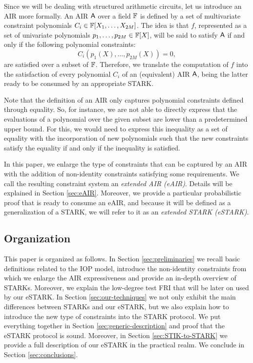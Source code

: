 Since we will be dealing with structured arithmetic circuits, let us introduce an AIR more formally. An AIR $\textsf{A}$ over a field $\mathbb{F}$ is defined by a set of multivariate constraint polynomials $C_i \in \mathbb{F}[X_1,\dots, X_{2M}]$. The idea is that $f$, represented as a set of univariate polynomials $p_1,\dots,p_{2M} \in \mathbb{F}[X]$, will be said to satisfy $\textsf{A}$ if and only if the following polynomial constraints:
\[
C_i(p_1(X),\dots, p_{2M}(X)) = 0,
\]
are satisfied over a subset of $\mathbb{F}$. Therefore, we translate the computation of $f$ into the satisfaction of every polynomial $C_i$ of an (equivalent) AIR $\textsf{A}$, being the latter ready to be consumed by an appropriate STARK. 

Note that the definition of an AIR only captures polynomial constraints defined through equality. So, for instance, we are not able to directly express that the evaluations of a polynomial over the given subset are lower than a predetermined upper bound. For this, we would need to express this inequality as a set of equality with the incorporation of new polynomials such that the new constraints satisfy the equality if and only if the inequality is satisfied.

In this paper, we enlarge the type of constraints that can be captured by an AIR with the addition of non-identity constraints satisfying some requirements. We call the resulting constraint system an \textit{extended AIR (eAIR)}. Details will be explained in Section \ref{sec:eAIR}. Moreover, we provide a particular probabilistic proof that is ready to consume an eAIR, and because it will be defined as a generalization of a STARK, we will refer to it as an \textit{extended STARK (eSTARK)}.



\subsection{Organization}

This paper is organized as follows. In Section \ref{sec:preliminaries} we recall basic definitions related to the IOP model, introduce the non-identity constraints from which we enlarge the AIR expressiveness and provide an in-depth overview of STARKs. Moreover, we explain the low-degree test FRI that will be later on used by our eSTARK. In Section \ref{sec:our-techniques} we not only exhibit the main differences between STARKs and our eSTARK, but we also explain how to introduce the new type of constraints into the STARK protocol. We put everything together in Section \ref{sec:generic-description} and proof that the eSTARK protocol is sound. Moreover, in Section \ref{sec:STIK-to-STARK} we provide a full description of our eSTARK in the practical realm. We conclude in Section \ref{sec:conclusions}.